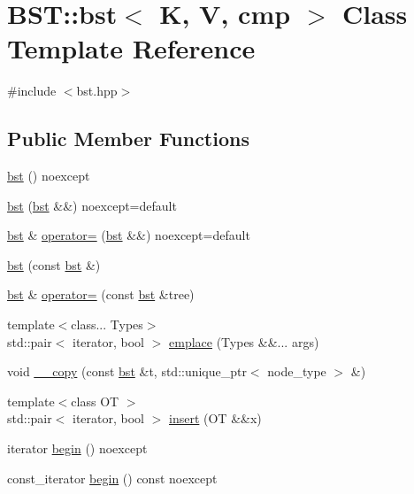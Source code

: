 \hypertarget{classBST_1_1bst}{}\section{B\+ST\+:\+:bst$<$ K, V, cmp $>$ Class Template Reference}
\label{classBST_1_1bst}


{\ttfamily \#include $<$bst.\+hpp$>$}

\subsection*{Public Member Functions}
\begin{DoxyCompactItemize}
\item 
\hyperlink{classBST_1_1bst_a4e9627986dc492f5b5ca99d81073cbae}{bst} () noexcept
\item 
\hyperlink{classBST_1_1bst_a2e920ad809f46ab051c9f49d5108bc70}{bst} (\hyperlink{classBST_1_1bst}{bst} \&\&) noexcept=default
\item 
\hyperlink{classBST_1_1bst}{bst} \& \hyperlink{classBST_1_1bst_abab0876508a7ed84d1256bb0e0139af6}{operator=} (\hyperlink{classBST_1_1bst}{bst} \&\&) noexcept=default
\item 
\hyperlink{classBST_1_1bst_ae959ba0709bffaa2617a87813baa2f34}{bst} (const \hyperlink{classBST_1_1bst}{bst} \&)
\item 
\hyperlink{classBST_1_1bst}{bst} \& \hyperlink{classBST_1_1bst_aa96092243a0acee13f8823006ca6fd34}{operator=} (const \hyperlink{classBST_1_1bst}{bst} \&tree)
\item 
{\footnotesize template$<$class... Types$>$ }\\std\+::pair$<$ iterator, bool $>$ \hyperlink{classBST_1_1bst_a39b5fa926b67f6f4089e32aeb63a74b9}{emplace} (Types \&\&... args)
\item 
void \hyperlink{classBST_1_1bst_aa6e180151029e2da1a960acd0b6959d6}{\+\_\+\+\_\+copy} (const \hyperlink{classBST_1_1bst}{bst} \&t, std\+::unique\+\_\+ptr$<$ node\+\_\+type $>$ \&)
\item 
{\footnotesize template$<$class OT $>$ }\\std\+::pair$<$ iterator, bool $>$ \hyperlink{classBST_1_1bst_a415605474ad54b651f34d73c448fdba3}{insert} (OT \&\&x)
\item 
iterator \hyperlink{classBST_1_1bst_a998e86071c043c562ac906197cbf015e}{begin} () noexcept
\item 
const\+\_\+iterator \hyperlink{classBST_1_1bst_a09b9837132cc0a911be4409bab8ab56f}{begin} () const noexcept

\end{DoxyCompactItemize}

